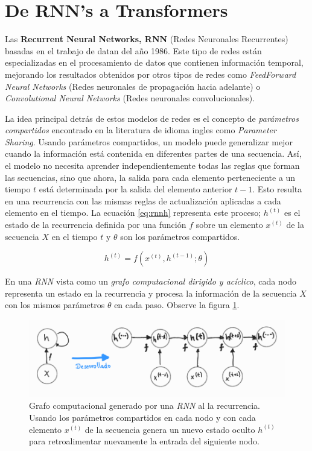\section{De RNN's a Transformers}

Las \textbf{Recurrent Neural Networks, RNN} (Redes Neuronales Recurrentes) basadas en el
trabajo de \citeauthor{Rumelhart} datan del año 1986. Este tipo de redes están especializadas
en el procesamiento de datos que contienen información temporal, mejorando los resultados obtenidos
por otros tipos de redes como \textit{FeedForward Neural Networks} (Redes neuronales de propagación
hacia adelante) o \textit{Convolutional Neural Networks} (Redes neuronales convolucionales).

La idea principal detrás de estos modelos de redes es el concepto de \textit{parámetros compartidos}
encontrado en la literatura de idioma ingles como \textit{Parameter Sharing}.
Usando parámetros compartidos, un modelo puede generalizar mejor cuando la información
está contenida en diferentes partes de una secuencia. Así, el modelo no necesita aprender
independientemente todas las reglas que forman las secuencias, sino que ahora, la salida para cada
elemento perteneciente a un tiempo $t$ está determinada por la salida del elemento anterior $t-1$.
Esto resulta en una recurrencia con las mismas reglas de actualización aplicadas a cada elemento en el tiempo.
La ecuación \ref{eq:rnnh} representa este proceso; $h^{(t)}$ es el estado de la recurrencia definida
por una función $f$ sobre un elemento $x^{(t)}$ de la secuencia $X$ en el tiempo $t$ y $\theta$ son
los parámetros compartidos.

\begin{equation}
    h^{(t)} = f(x^{(t)}, h^{(t-1)}; \theta)
    \label{eq:rnnh}
\end{equation}

En una \textit{RNN} vista como un \textit{grafo computacional dirigido y acíclico}, cada nodo
representa un estado en la recurrencia y procesa la información de la secuencia $X$ con los mismos
parámetros $\theta$ en cada paso. Observe la figura \ref{fig:rnn_cg}.

\begin{figure}[!ht]
\centering
\includegraphics[width=.8\textwidth]{Chapters/2. Transformer/Figures/rnn/rnn_cgraph.png}
\caption{Grafo computacional generado por una \textit{RNN} al
         la recurrencia. Usando los parámetros compartidos en cada nodo
        y con cada elemento $x^{(t)}$ de la secuencia genera un nuevo estado oculto $h^{(t)}$
        para retroalimentar nuevamente la entrada del siguiente nodo.}
\label{fig:rnn_cg}
\end{figure}

